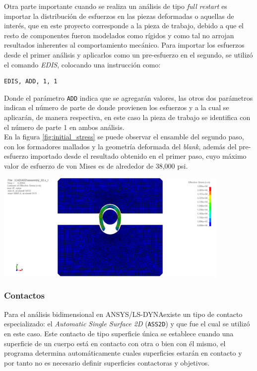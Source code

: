Otra parte importante cuando se realiza un análisis de tipo \textit{full restart} es importar la distribución 
de esfuerzos en las piezas deformadas o aquellas de interés, que en este proyecto corresponde a la pieza 
de trabajo, debido a que el resto de componentes fueron modelados como rígidos y como tal no arrojan resultados 
inherentes al comportamiento mecánico. Para importar los esfuerzos desde el primer análisis y aplicarlos 
como un pre-esfuerzo en el segundo, se utilizó el comando \textit{EDIS}, colocando una instrucción como:

\begin{verbatim}
EDIS, ADD, 1, 1
\end{verbatim}

Donde el parámetro \texttt{ADD} indica que se agregarán valores, las otros dos parámetros indican el número 
de parte de donde provienen los esfuerzos y a la cual se aplicarán, de manera respectiva, en este caso 
la pieza de trabajo se identifica con el número de parte 1 en ambos análisis. \\

En la figura \ref{fig:initial_stress} se puede observar el ensamble del segundo paso, con los formadores 
mallados y la geometría deformada del \textit{blank}, además del pre-esfuerzo importado desde el resultado 
obtenido en el primer paso, cuyo máximo valor de esfuerzo de von Mises es de alrededor de 38,000 psi.

\begin{center}
\includegraphics[width=0.85\textwidth]{src/ch3/initial_stress.png}
\label{fig:initial_stress}
\end{center}

\subsubsection{Contactos}\label{sec:contactos}

Para el análisis bidimensional en ANSYS/LS-DYNA\CR existe un tipo de contacto especializado: 
el \textit{Automatic Single Surface 2D} (\texttt{ASS2D}) y que fue el cual se utilizó en este caso. 
Este contacto de tipo superficie única se establece cuando una superficie de un cuerpo está 
en contacto con otra o bien con él mismo, el programa determina automáticamente cuales superficies 
estarán en contacto y por tanto no es necesario definir superficies contactoras y objetivos.\\

